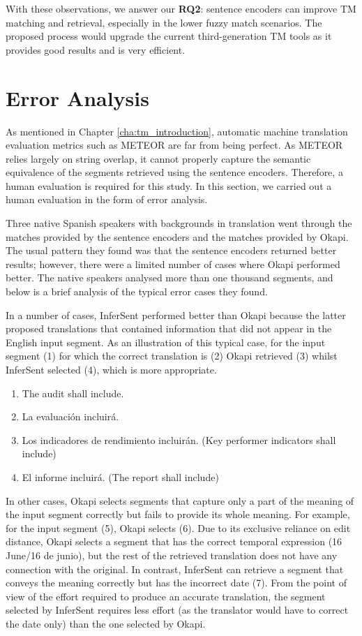 With these observations, we answer our \textbf{RQ2}: sentence encoders can improve TM matching and retrieval, especially in the lower fuzzy match scenarios. The proposed process would upgrade the current third-generation TM tools as it provides good results and is very efficient.

\section{Error Analysis}
\label{sec:tm_sentence_encoders_error}
As mentioned in Chapter \ref{cha:tm_introduction}, automatic machine translation evaluation metrics such as METEOR are far from being perfect. As METEOR relies largely on string overlap, it cannot properly capture the semantic equivalence of the segments retrieved using the sentence encoders. Therefore, a human evaluation is required for this study. In this section, we carried out a human evaluation in the form of error analysis.

Three native Spanish speakers with backgrounds in translation went through the matches provided by the sentence encoders and the matches provided by Okapi. The usual pattern they found was that the sentence encoders returned better results; however, there were a limited number of cases where Okapi performed better. The native speakers analysed more than one thousand segments, and below is a brief analysis of the typical error cases they found.

In a number of cases, InferSent performed better than Okapi because the latter proposed translations that contained information that did not appear in the English input segment. As an illustration of this typical case, for the input segment (1) for which the correct translation is (2) Okapi retrieved (3) whilst InferSent selected (4), which is more appropriate. 

\begin{enumerate}[label={(\arabic*)}]
	\item The audit shall include.
	\item La evaluación incluirá.
	\item Los indicadores de rendimiento incluirán. (Key performer indicators shall include)
	\item El informe incluirá. (The report shall include)
\end{enumerate}

In other cases, Okapi selects segments that capture only a part of the meaning of the input segment correctly but fails to provide its whole meaning. For example, for the input segment (5), Okapi selects (6). Due to its exclusive reliance on edit distance, Okapi selects a segment that has the correct temporal expression (16 June/16 de junio), but the rest of the retrieved translation does not have any connection with the original. In contrast, InferSent can retrieve a segment that conveys the meaning correctly but has the incorrect date (7). From the point of view of the effort required to produce an accurate translation, the segment selected by InferSent requires less effort (as the translator would have to correct the date only) than the one selected by Okapi. 

